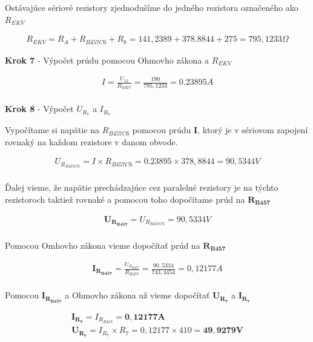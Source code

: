 \noindent Ostávajúce sériové rezistory zjednodušíme do jedného rezistora označeného ako $R_{EKV}$ 

\begin{gather*}
    R_{EKV} = R_{A} + R_{B457C6} + R_{8} = 141,2389 + 378.8844 + 275 = 795,1233 \Omega
\end{gather*}

\newpage

\begin{center}
\textbf{Krok 7} - Výpočet prúdu pomocou Ohmovho zákona a $R_{EKV}$
\end{center}

\begin{gather*}
   I = \frac {U_{12}} {R_{EKV}} = \frac {190} {795,1233} = 0.23895 A \\
\end{gather*}

\begin{center}
\textbf{Krok 8} - Výpočet $U_{R_{7}}$ a $I_{R_{7}}$
\end{center}

Vypočítame si napätie na $R_{B457C6}$ pomocou prúdu $\boldsymbol{I}$, ktorý je v sériovom zapojení rovnaký na každom rezistore v danom obvode.

\begin{gather*}
    U_{R_{B457C6}} = I \times R_{B457C6} = 0.23895 \times 378,8844 = 90,5344 V \\
\end{gather*}

\noindent Ďalej vieme, že napätie prechádzajúce cez paralelné rezistory je na týchto rezistoroch taktiež rovnaké a pomocou toho dopočítame prúd na $\boldsymbol{R_{B457}}$

\begin{gather*}
    \boldsymbol{U_{R_{B457}}} = U_{R_{B457C6}} = 90,5334 V \\
\end{gather*}

\noindent Pomocou Omhovho zákona vieme dopočítať prúd na $\boldsymbol{R_{B457}}$

\begin{gather*}
   \boldsymbol{I_{R_{B457}}} = \frac {U_{R_{B457}}} {R_{B457}} = \frac{90,5334} {743,4454} = 0,12177 A \\
\end{gather*}

\noindent Pomocou $\boldsymbol{I_{R_{B457}}}$ a Ohmovho zákona už vieme dopočítať $\boldsymbol{U_{R_{7}}}$ a $\boldsymbol{I_{R_{7}}}$

\begin{gather*}
   \boldsymbol{I_{R_{7}}} = I_{R_{B457}} = \boldsymbol{0,12177 A} \\
   \boldsymbol{U_{R_{7}}} = I_{R_{7}} \times {R_{7}} = 0,12177 \times 410 = \boldsymbol{49,9279 V} \\
\end{gather*}

 

